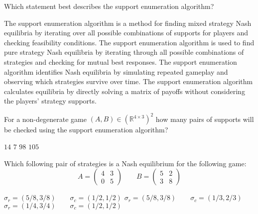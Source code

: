 \documentclass{exam}
\begin{document}
\begin{questions}
        
    \question
    Which statement best describes the support enumeration algorithm?

    \begin{checkboxes}
\choice The support enumeration algorithm is a method for finding mixed strategy Nash equilibria by iterating over all possible combinations of supports for players and checking feasibility conditions.
\choice The support enumeration algorithm is used to find pure strategy Nash equilibria by iterating through all possible combinations of strategies and checking for mutual best responses.
\choice The support enumeration algorithm identifies Nash equilibria by simulating repeated gameplay and observing which strategies survive over time.
\choice The support enumeration algorithm calculates equilibria by directly solving a matrix of payoffs without considering the players’ strategy supports.
    \end{checkboxes}


\question
    For a non-degenerate game \((A, B)\in{\left(\mathbb{R}^{4 \times 3}\right)}^2\) how many pairs of supports
    will be checked using the support enumeration algorithm?

    \begin{checkboxes}
        \choice \(14\)
        \choice \(7\)
        \choice \(98\)
        \choice \(105\)
    \end{checkboxes}

    \question Which following pair of strategies is a Nash equilibrium for the
    following game:
     \[
     A=\begin{pmatrix}4 & 3\\ 0& 5\end{pmatrix}
     \qquad
     B=\begin{pmatrix}5 & 2\\ 3& 8\end{pmatrix}
 \]
    \begin{checkboxes}
        \choice
    \(
    \sigma_r=(5/8, 3/8)\qquad\sigma_c = (1/2, 1/2)
    \)
        \choice
    \(
    \sigma_r=(5/8, 3/8)\qquad\sigma_c = (1/3, 2/3)
    \)
        \choice
    \(
    \sigma_r=(1/4, 3/4)\qquad\sigma_c = (1/2, 1/2)
    \)
\end{checkboxes}

\end{questions}
\end{document}
